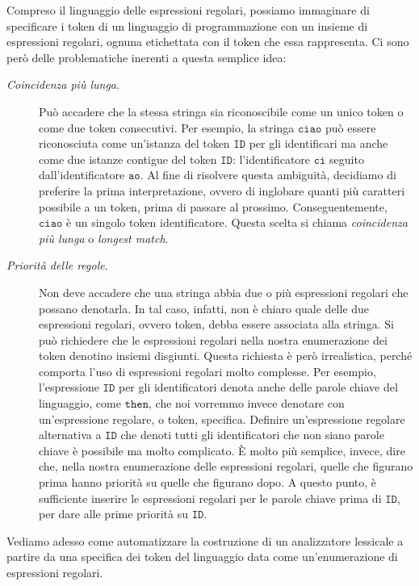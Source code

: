 %
Compreso il linguaggio delle espressioni regolari, possiamo immaginare di
specificare i token di un linguaggio di programmazione con un insieme di
espressioni regolari, ognuna etichettata con il token che essa rappresenta.
Ci sono per\`o delle problematiche inerenti a questa semplice idea:
%
\begin{description}
\item[\textit{Coincidenza pi\`u lunga}.]
  Pu\`o accadere che la stessa stringa sia
  riconoscibile come un unico token o come due token consecutivi. Per esempio,
  la stringa $\mathtt{ciao}$ pu\`o essere riconosciuta come un'istanza del
  token $\mathtt{ID}$ per gli identificari ma anche come due istanze contigue
  del token $\mathtt{ID}$: l'identificatore $\mathtt{ci}$ seguito
  dall'identificatore
  $\mathtt{ao}$. Al fine di risolvere questa ambiguit\`a, decidiamo di
  preferire la prima interpretazione, ovvero di inglobare quanti pi\`u
  caratteri possibile a un token, prima di passare al prossimo.
  Conseguentemente, $\mathtt{ciao}$ \`e un singolo token identificatore.
  Questa scelta si chiama \emph{coincidenza pi\`u lunga} o
  \emph{longest match}.
\item[\textit{Priorit\`a delle regole}.]
  Non deve accadere che una stringa abbia due o pi\`u espressioni
  regolari che possano denotarla. In tal caso, infatti, non \`e chiaro
  quale delle due espressioni regolari, ovvero token, debba essere associata
  alla stringa. Si pu\`o richiedere che le espressioni regolari nella nostra
  enumerazione dei token denotino insiemi disgiunti. Questa richiesta \`e
  per\`o irrealistica, perch\'e comporta l'uso di espressioni regolari
  molto complesse. Per esempio, l'espressione $\mathtt{ID}$ per gli
  identificatori
  denota anche delle parole chiave del linguaggio, come $\mathtt{then}$, che
  noi vorremmo invece denotare con un'espressione regolare, o token, specifica.
  Definire un'espressione regolare alternativa a $\mathtt{ID}$ che denoti tutti
  gli identificatori che non siano parole chiave \`e possibile ma molto
  complicato. \`E molto pi\`u semplice, invece, dire che, nella nostra
  enumerazione delle espressioni regolari, quelle che
  figurano prima hanno priorit\`a su quelle che figurano dopo. A questo punto,
  \`e sufficiente inserire le espressioni regolari per le parole chiave
  prima di $\mathtt{ID}$, per dare alle prime priorit\`a su $\mathtt{ID}$.
\end{description}

Vediamo adesso come automatizzare la costruzione di un analizzatore
lessicale a partire da una specifica dei token del linguaggio data come
un'enumerazione di espressioni regolari.
%
